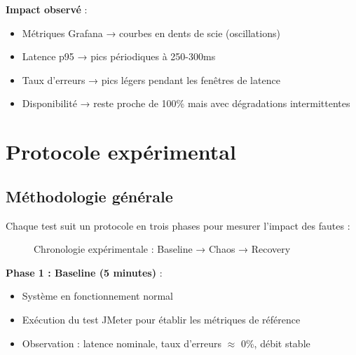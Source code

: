 \textbf{Impact observé} :
\begin{itemize}
    \item Métriques Grafana → courbes en dents de scie (oscillations)
    \item Latence p95 → pics périodiques à 250-300ms
    \item Taux d'erreurs → pics légers pendant les fenêtres de latence
    \item Disponibilité → reste proche de 100\% mais avec dégradations intermittentes
\end{itemize}

\section{Protocole expérimental}

\subsection{Méthodologie générale}

Chaque test suit un protocole en trois phases pour mesurer l'impact des fautes :

\begin{figure}[H]
\centering
{}
\caption{Chronologie expérimentale : Baseline → Chaos → Recovery}
\end{figure}

\textbf{Phase 1 : Baseline (5 minutes)} :
\begin{itemize}
    \item Système en fonctionnement normal
    \item Exécution du test JMeter pour établir les métriques de référence
    \item Observation : latence nominale, taux d'erreurs $\approx$ 0\%, débit stable
\end{itemize}

